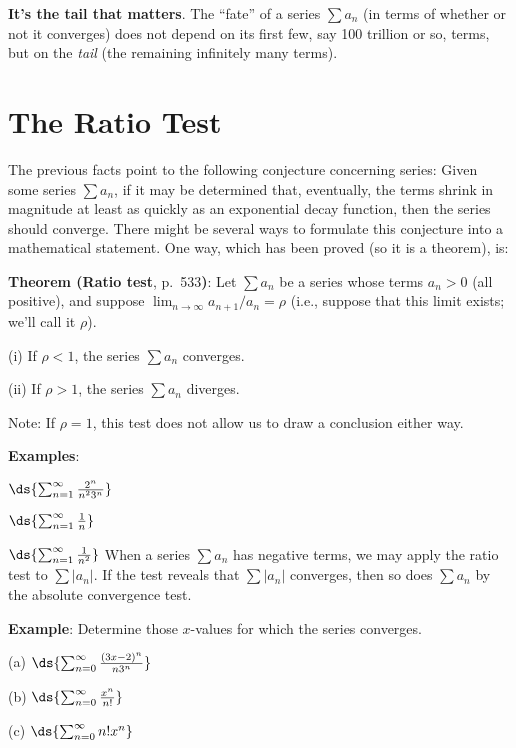 \documentclass[12pt,fleqn]{article}
\begin{document}
\item
  {\bf It's the tail that matters}.  The ``fate'' of a series
  $\sum a_n$ (in terms of whether or not it converges) does not depend
  on its first few, say 100 trillion or so, terms, but on the {\em tail}
  (the remaining infinitely many terms).

\ei

\np
\section*{The Ratio Test}

\ni
The previous facts point to the following conjecture concerning series:
\bq
  Given some series $\sum a_n$, if it may be determined that,
  eventually, the terms shrink in magnitude at least as quickly as
  an exponential decay function, then the series should converge.
\eq
There might be several ways to formulate this conjecture into a
mathematical statement.  One way, which has been proved (so it is
a theorem), is:

\vs{0.2in}
\ni
{\bf Theorem (Ratio test}, p.~533{\bf{)}}:
Let $\sum a_n$ be a series whose terms $a_n > 0$ (all positive),
and suppose $\lim_{n\rightarrow\infty} a_{n+1}/a_n = \rho$ (i.e.,
suppose that this limit exists; we'll call it $\rho$).
\bi
\item[(i)]
  If $\rho < 1$, the series $\sum a_n$ converges.
\item[(ii)]
  If $\rho > 1$, the series $\sum a_n$ diverges.
\ei

\vs{0.2in}
\ni
Note: If $\rho = 1$, this test does not allow us to draw
a conclusion either way.

\vs{0.2in}
\ni
{\bf Examples}:
\bi
\item[] $\ds{\sum_{n=1}^\infty \frac{2^n}{n^2 3^n}}$
\item[] $\ds{\sum_{n=1}^\infty \frac{1}{n}}$
\item[] $\ds{\sum_{n=1}^\infty \frac{1}{n^2}}$
\ei
When a series $\sum a_n$ has negative terms, we may apply the
ratio test to $\sum |a_n|$.  If the test reveals that $\sum |a_n|$
converges, then so does $\sum a_n$ by the absolute convergence test.

\vs{0.2in}
\ni
{\bf Example}: Determine those $x$-values for which the series converges.
\bi
\item[(a)] $\ds{\sum_{n=0}^\infty \frac{(3x-2)^n}{n 3^n}}$
\item[(b)] $\ds{\sum_{n=0}^\infty \frac{x^n}{n!}}$
\item[(c)] $\ds{\sum_{n=0}^\infty n! x^n}$
\ei
\end{document}
